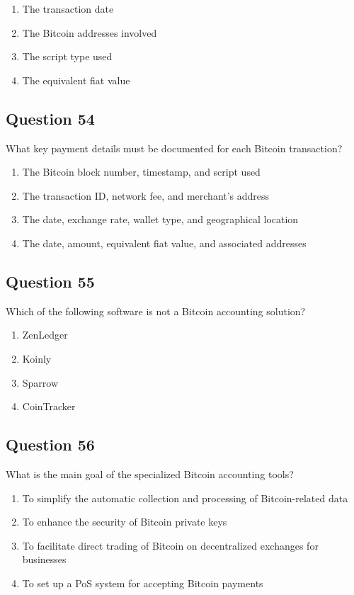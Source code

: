\documentclass[12pt,a4paper]{article}
\begin{document}
\begin{enumerate}[label=\Alph*., leftmargin=*]
\item The transaction date
\item The Bitcoin addresses involved
\item The script type used
\item The equivalent fiat value
\end{enumerate}

\bigskip


\subsection*{Question 54}
What key payment details must be documented for each Bitcoin transaction?

\begin{enumerate}[label=\Alph*., leftmargin=*]
\item The Bitcoin block number, timestamp, and script used
\item The transaction ID, network fee, and merchant's address
\item The date, exchange rate, wallet type, and geographical location
\item The date, amount, equivalent fiat value, and associated addresses
\end{enumerate}

\bigskip


\subsection*{Question 55}
Which of the following software is not a Bitcoin accounting solution?

\begin{enumerate}[label=\Alph*., leftmargin=*]
\item ZenLedger
\item Koinly
\item Sparrow
\item CoinTracker
\end{enumerate}

\bigskip


\subsection*{Question 56}
What is the main goal of the specialized Bitcoin accounting tools?

\begin{enumerate}[label=\Alph*., leftmargin=*]
\item To simplify the automatic collection and processing of Bitcoin-related data
\item To enhance the security of Bitcoin private keys
\item To facilitate direct trading of Bitcoin on decentralized exchanges for businesses
\item To set up a PoS system for accepting Bitcoin payments
\end{enumerate}
\end{document}
